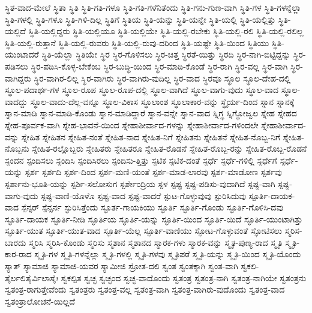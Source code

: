 {ಸ್ಥಿತ-ವಾದ-ಮೇಲೆ
ಸ್ಥಿತಾ
ಸ್ಥಿತಿ
ಸ್ಥಿತಿ-ಗತಿ-ಗಳೂ
ಸ್ಥಿತಿ-ಗತಿ-ಗಳೆನಿತೆಂದು
ಸ್ಥಿತಿ-ಗನು-ಗುಣ-ವಾಗಿ
ಸ್ಥಿತಿ-ಗಳ
ಸ್ಥಿತಿ-ಗಳನ್ನೆಲ್ಲಾ
ಸ್ಥಿತಿ-ಗಳಲ್ಲಿ
ಸ್ಥಿತಿ-ಗಳೂ
ಸ್ಥಿತಿ-ಗಿಳಿ-ದಿಲ್ಲ
ಸ್ಥಿತಿಗೆ
ಸ್ಥಿತಿಯ
ಸ್ಥಿತಿ-ಯನ್ನು
ಸ್ಥಿತಿ-ಯನ್ನೇ
ಸ್ಥಿತಿ-ಯಲ್ಲಿ
ಸ್ಥಿತಿ-ಯಲ್ಲಿತ್ತು
ಸ್ಥಿತಿ-ಯಲ್ಲಿದೆ
ಸ್ಥಿತಿ-ಯಲ್ಲಿದ್ದರು
ಸ್ಥಿತಿ-ಯಲ್ಲಿಯೂ
ಸ್ಥಿತಿ-ಯಲ್ಲಿಯೇ
ಸ್ಥಿತಿ-ಯಲ್ಲಿ-ರಬೇಕು
ಸ್ಥಿತಿ-ಯಲ್ಲಿ-ರಲಿ
ಸ್ಥಿತಿ-ಯಲ್ಲಿ-ರಲಿಲ್ಲ
ಸ್ಥಿತಿ-ಯಲ್ಲಿ-ರುತ್ತಾನೆ
ಸ್ಥಿತಿ-ಯಲ್ಲಿ-ರುವರು
ಸ್ಥಿತಿ-ಯಲ್ಲಿ-ರುವು-ದರಿಂದ
ಸ್ಥಿತಿ-ಯಷ್ಟೇ
ಸ್ಥಿತಿ-ಯಿಂದ
ಸ್ಥಿತಿಯು
ಸ್ಥಿತಿ-ಯುಂಟಾದರೆ
ಸ್ಥಿತಿ-ಯೆಲ್ಲಾ
ಸ್ಥಿತಿಯೇ
ಸ್ಥಿರ
ಸ್ಥಿರ-ಗೊಳಿಸಲು
ಸ್ಥಿರ-ಚಿತ್ತ
ಸ್ಥಿರತೆ-ಯಿತ್ತು
ಸ್ಥಿರದಿ
ಸ್ಥಿರ-ನಾಗಿ-ಬಿಟ್ಟಿದ್ದನ್ನು
ಸ್ಥಿರ-ಪಡಿಸಲು
ಸ್ಥಿರ-ಪಡಿಸಿ-ಕೊಳ್ಳ-ಬೇಕೆಂಬ
ಸ್ಥಿರ-ಬುದ್ಧಿ-ಯಿಂದ
ಸ್ಥಿರ-ಮಾಡಿ-ಕೊಂಡೆ
ಸ್ಥಿರ-ರಾಗಿ
ಸ್ಥಿರ-ವಲ್ಲ
ಸ್ಥಿರ-ವಾಗಿ
ಸ್ಥಿರ-ವಾಗಿದ್ದರು
ಸ್ಥಿರ-ವಾಗಿರ-ಲಿಲ್ಲ
ಸ್ಥಿರ-ವಾಗಿರು
ಸ್ಥಿರ-ವಾಗಿರು-ವುದಿಲ್ಲ
ಸ್ಥಿರ-ವಾದ
ಸ್ಥಿರವೂ
ಸ್ಥೂಲ
ಸ್ಥೂಲ-ದೇಹ-ದಲ್ಲಿ
ಸ್ಥೂಲ-ಪದಾರ್ಥ-ಗಳ
ಸ್ಥೂಲ-ರೂಪ
ಸ್ಥೂಲ-ರೂಪ-ದಲ್ಲಿ
ಸ್ಥೂಲ-ವಾಗಿದೆ
ಸ್ಥೂಲ-ವಾಗು-ವುದು
ಸ್ಥೂಲ-ವಾದ
ಸ್ಥೂಲ-ವಾದದ್ದು
ಸ್ಥೂಲ-ವಾದು-ದೆಲ್ಲ-ವನ್ನೂ
ಸ್ಥೂಲ-ವಿಕಾಸ
ಸ್ಥೂಲಾಂಶ
ಸ್ಥೂಲಾಕಾರ-ವನ್ನು
ಸ್ಥೈರ್ಯ-ದಿಂದ
ಸ್ನಾನ
ಸ್ನಾನಕ್ಕೆ
ಸ್ನಾನ-ಮಾಡಿ
ಸ್ನಾನ-ಮಾಡಿ-ಕೊಂಡು
ಸ್ನಾನ-ಮಾಡಿದ್ದಾರೆ
ಸ್ನಾನ-ವನ್ನೇ
ಸ್ನಾನ-ವಾದ
ಸ್ನಿಗ್ಧ
ಸ್ನಿಗ್ಧೋಜ್ವಲ
ಸ್ನೇಹ
ಸ್ನೇಹದ
ಸ್ನೇಹ-ಪೂರ್ವಕ-ವಾಗಿ
ಸ್ನೇಹ-ಭಾವನೆ-ಯಿಂದ
ಸ್ನೇಹಾಶೀರ್ವಾದ-ಗಳನ್ನು
ಸ್ನೇಹಾಶೀರ್ವಾದ-ಗಳಿಂದಲೇ
ಸ್ನೇಹಾಶೀರ್ವಾದ-ವನ್ನು
ಸ್ನೇಹಿತ
ಸ್ನೇಹಿತನ
ಸ್ನೇಹಿತ-ನಂತೆ
ಸ್ನೇಹಿತ-ನಾದ
ಸ್ನೇಹಿತ-ನಿಗೆ
ಸ್ನೇಹಿತನು
ಸ್ನೇಹಿತನೆ
ಸ್ನೇಹಿತ-ನೊಬ್ಬ-ನಿಗೆ
ಸ್ನೇಹಿತ-ನೊಬ್ಬನು
ಸ್ನೇಹಿತ-ರಲ್ಲೊಬ್ಬರು
ಸ್ನೇಹಿತರು
ಸ್ನೇಹಿತರೂ
ಸ್ನೇಹಿತ-ರೊಡನೆ
ಸ್ನೇಹಿತ-ರೊಬ್ಬ-ರನ್ನು
ಸ್ನೇಹಿತ-ರೊಬ್ಬ-ರೊಡನೆ
ಸ್ಪಂದನ
ಸ್ಪಂದಿಸಲು
ಸ್ಪಂದಿಸಿ
ಸ್ಪಂದಿಸಿರಲು
ಸ್ಪಂದಿಸು-ತ್ತಿತ್ತು
ಸ್ಪಟಿಕ
ಸ್ಪಟಿಕ-ದಂತೆ
ಸ್ಪರ್ಧೆ
ಸ್ಪರ್ಧೆ-ಗಳಿಲ್ಲಿ
ಸ್ಪರ್ಧೆಗೆ
ಸ್ಪರ್ಧೆ-ಯನ್ನು
ಸ್ಪರ್ಶ
ಸ್ಪರ್ಶದಿ
ಸ್ಪರ್ಶ-ದಿಂದ
ಸ್ಪರ್ಶ-ಮಣಿ-ಯಂತೆ
ಸ್ಪರ್ಶ-ಮಾಡ-ಲಾರವು
ಸ್ಪರ್ಶ-ಮಾಡೋಣ
ಸ್ಪರ್ಶವು
ಸ್ಪರ್ಶಾನು-ಭೂತಿ-ಯನ್ನು
ಸ್ಪರ್ಶಿ-ಸಲೋಸುಗ
ಸ್ಪರ್ಶೇಂದ್ರಿಯ
ಸ್ಪಳ
ಸ್ಪಷ್ಟ
ಸ್ಪಷ್ಟ-ಪಡಿಸು-ವುದಾಗಿದೆ
ಸ್ಪಷ್ಟ-ವಾಗಿ
ಸ್ಪಷ್ಟ-ವಾಗು-ವುದು
ಸ್ಪಷ್ಟ-ವಾಣಿ-ಯೊಳೊ
ಸ್ಪಷ್ಟ-ವಾದ
ಸ್ಪಷ್ಟ-ವಾದರೆ
ಸ್ಪುಟ-ಗೊಳ್ಳುವುವು
ಸ್ಪುರಿಸಿದುವು
ಸ್ಪೂರ್ತಿ-ದಾಯಕ-ವಾದ
ಸ್ಪೆನ್ಸರ್
ಸ್ಪೆನ್ಸರ್ನ
ಸ್ಫುರಿಸಿತ್ತೆಂದು
ಸ್ಫೂರ್ತ-ಗಾಯಕಿಯು
ಸ್ಫೂರ್ತಿ
ಸ್ಫೂರ್ತಿ-ಗೊಂಡು
ಸ್ಫೂರ್ತಿ-ಗೊಳಿಸಿ-ದವು
ಸ್ಫೂರ್ತಿ-ದಾಯಕ
ಸ್ಫೂರ್ತಿ-ನೀಡಿ
ಸ್ಫೂರ್ತಿಯ
ಸ್ಫೂರ್ತಿ-ಯನ್ನು
ಸ್ಫೂರ್ತಿ-ಯಿಂದ
ಸ್ಫೂರ್ತಿ-ಯಿದೆ
ಸ್ಫೂರ್ತಿ-ಯುಂಟಾಗಿತ್ತು
ಸ್ಫೂರ್ತಿ-ಯುತ
ಸ್ಫೂರ್ತಿ-ಯುತ-ವಾದ
ಸ್ಫೂರ್ತಿ-ಯೆಲ್ಲ
ಸ್ಫೂರ್ತಿ-ವಾಣಿಯು
ಸ್ಫೋಟ-ಗೊಳ್ಳುವಂತೆ
ಸ್ಫೋಟಿಸಲು
ಸ್ಮರಿಸ-ಬಾರದು
ಸ್ಮರಿಸಿ
ಸ್ಮರಿಸಿ-ಕೊಂಡು
ಸ್ಮರಿಸು
ಸ್ಮಶಾನ
ಸ್ಮಶಾನದ
ಸ್ಮಾರಕ-ಗಳು
ಸ್ಮಾರಕ-ವನ್ನು
ಸ್ಮೃತ-ಪುಣ್ಯ-ರಾದ
ಸ್ಮೃತಿ
ಸ್ಮೃತಿ-ಕಾರ-ರಾದ
ಸ್ಮೃತಿ-ಗಳ
ಸ್ಮೃತಿ-ಗಳನ್ನೆಲ್ಲಾ
ಸ್ಮೃತಿ-ಗಳಲ್ಲಿ
ಸ್ಮೃತಿ-ಗಳವು
ಸ್ಮೃತಿಪಠೆ
ಸ್ಮೃತಿ-ಯನ್ನು
ಸ್ಮೃತಿ-ಯಿಂದ
ಸ್ಮೃತಿ-ಯೊಂದು
ಸ್ಯಾತ್
ಸ್ಯಾಮಾಜಿ
ಸ್ಯಾಮಾಜಿ-ಯವರ
ಸ್ಯಾಮೀಜಿ
ಸ್ರೋತ-ದಲಿ
ಸ್ವಂತ
ಸ್ವಂತಕ್ಕಾಗಿ
ಸ್ವಂತ-ವಾಗಿ
ಸ್ವಕಲಿ-ತೈರ್ಲಲಿತೈರ್ವಿಲಾಸೈಃ
ಸ್ವಕಲ್ಪಿತ
ಸ್ವಚ್ಛ
ಸ್ವಚ್ಛಂದ
ಸ್ವಚ್ಛ-ವಾದೊಂದು
ಸ್ವತಂತ್ರ
ಸ್ವತಂತ್ರ-ನಾಗಿ
ಸ್ವತಂತ್ರ-ನಾಗಿಯೇ
ಸ್ವತಂತ್ರನು
ಸ್ವತಂತ್ರ-ರಾಗುತ್ತೇವೆಂದು
ಸ್ವತಂತ್ರರು
ಸ್ವತಂತ್ರ-ವಲ್ಲ
ಸ್ವತಂತ್ರ-ವಾಗಿ
ಸ್ವತಂತ್ರ-ವಾಗಿರು-ವುದೊಂದು
ಸ್ವತಂತ್ರ-ವಾದ
ಸ್ವತಂತ್ರಾಲೋಚನೆ-ಯಿಲ್ಲದೆ
}
